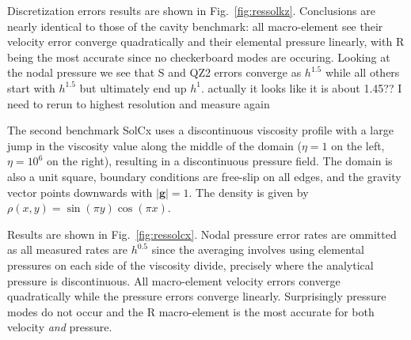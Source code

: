 \documentclass[a4paper,12pt]{article}
\begin{document}
Discretization errors results are shown in Fig.~\ref{fig:ressolkz}.
Conclusions are nearly identical to those of the cavity benchmark:
all macro-element see their velocity error converge quadratically 
and their elemental pressure linearly, with R being the most accurate since 
no checkerboard modes are occuring.
Looking at the nodal pressure we see that S and QZ2 errors converge as $h^{1.5}$
while all others start with $h^{1.5}$ but ultimately end up $h^1$. 
{\color{red} actually it looks like it is about 1.45?? I need to rerun to highest resolution
and measure again}

The second benchmark SolCx uses a discontinuous viscosity profile with a large jump in
the viscosity value along the middle of the domain ($\eta=1$ on the left,
$\eta=10^6$ on the right), resulting in a discontinuous pressure field. 
The domain is also a unit square, boundary conditions are free-slip on all edges, and
the gravity vector points downwards with $|{\bm g}| = 1$. 
The density is given by $\rho(x,y) = \sin(\pi y) \cos(\pi x)$.

Results are shown in Fig.~\ref{fig:ressolcx}.
Nodal pressure error rates are ommitted as all 
measured rates are $h^{0.5}$ since the averaging 
involves using elemental pressures on each side of the viscosity divide,
precisely where the analytical pressure is discontinuous.
All macro-element velocity errors converge quadratically 
while the pressure errors converge linearly.
Surprisingly pressure modes do not occur and the R macro-element
is the most accurate for both velocity {\it and} pressure.
\end{document}
